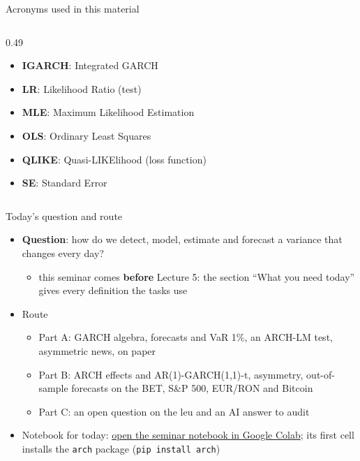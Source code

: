 \begin{frame}{Acronyms used in this material}
\begin{columns}[T]
\begin{column}{0.49\textwidth}
\begin{itemize}
    \item \textbf{IGARCH}: Integrated GARCH
    \item \textbf{LR}: Likelihood Ratio (test)
    \item \textbf{MLE}: Maximum Likelihood Estimation
    \item \textbf{OLS}: Ordinary Least Squares
    \item \textbf{QLIKE}: Quasi-LIKElihood (loss function)
    \item \textbf{SE}: Standard Error
\end{itemize}
\end{column}
\end{columns}
\end{frame}

\begin{frame}{Today's question and route}
\itemsize{\small}
\begin{itemize}
    \item \textbf{Question}: how do we detect, model, estimate and forecast a variance that changes every day?
    \begin{itemize}
        \item this seminar comes \textbf{before} Lecture 5: the section ``What you need today'' gives every definition the tasks use
    \end{itemize}
    \item Route
    \begin{itemize}
        \item Part A: GARCH algebra, forecasts and VaR 1\%, an ARCH-LM test, asymmetric news, on paper
        \item Part B: ARCH effects and AR(1)-GARCH(1,1)-t, asymmetry, out-of-sample forecasts on the BET, S\&P 500, EUR/RON and Bitcoin
        \item Part C: an open question on the leu and an AI answer to audit
    \end{itemize}
    \item Notebook for today: \href{\nb}{open the seminar notebook in Google Colab}; its first cell installs the \texttt{arch} package (\texttt{pip install arch})
\end{itemize}
\end{frame}

